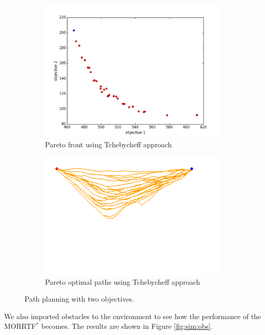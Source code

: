 \documentclass[conference]{IEEEtran}
\begin{document}
\begin{figure}
\begin{subfigure}[b]{0.45\linewidth}
		\includegraphics[width=\textwidth]{fig/sim2-2obj/PF02-MORRT2.png}
		\caption{Pareto front using Tchebycheff approach}
		\label{fig:sim:norm:pf:c}
	\end{subfigure} 
	\begin{subfigure}[b]{0.45\linewidth}
		\centering
		\includegraphics[width=\textwidth]{fig/sim2-2obj/MORRTstar00-ALL.png}
		\caption{Pareto optimal paths using Tchebycheff approach}
		\label{fig:sim:norm:sols:c}
	\end{subfigure}
	\caption{Path planning with two objectives.}
	\label{fig:sim:norm}
\end{figure}

We also imported obstacles to the environment to see how the performance of the MORRTF$^{*}$ becomes.
The results are shown in Figure \ref{fig:sim:obs}.
\end{document}
